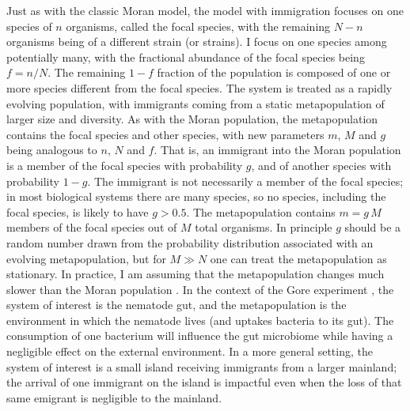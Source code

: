 Just as with the classic Moran model, the model with immigration focuses on one species of $n$ organisms, called the focal species, with the remaining $N-n$ organisms being of a different strain (or strains). 
I focus on one species among potentially many, with the fractional abundance of the focal species being $f=n/N$. 
The remaining $1-f$ fraction of the population is composed of one or more species different from the focal species. 
The system is treated as a rapidly evolving population, with immigrants coming from a static metapopulation of larger size and diversity. 
As with the Moran population, the metapopulation contains the focal species and other species, with new parameters $m$, $M$ and $g$ being analogous to $n$, $N$ and $f$. 
That is, an immigrant into the Moran population is a member of the focal species with probability $g$, and of another species with probability $1-g$. 
The immigrant is not necessarily a member of the focal species; in most biological systems there are many species, so no species, including the focal species, is likely to have $g>0.5$. 
The metapopulation contains $m = g\,M$ members of the focal species out of $M$ total organisms. 
In principle $g$ should be a random number drawn from the probability distribution associated with an evolving metapopulation, but for $M\gg N$ one can treat the metapopulation as stationary. 
In practice, I am assuming that the metapopulation changes much slower than the Moran population \cite{McKane2003}. %
In the context of the Gore experiment \cite{Vega2017}, the system of interest is the nematode gut, and the metapopulation is the environment in which the nematode lives (and uptakes bacteria to its gut). 
The consumption of one bacterium will influence the gut microbiome while having a negligible effect on the external environment. 
In a more general setting, the system of interest is a small island receiving immigrants from a larger mainland; the arrival of one immigrant on the island is impactful even when the loss of that same emigrant is negligible to the mainland. 

